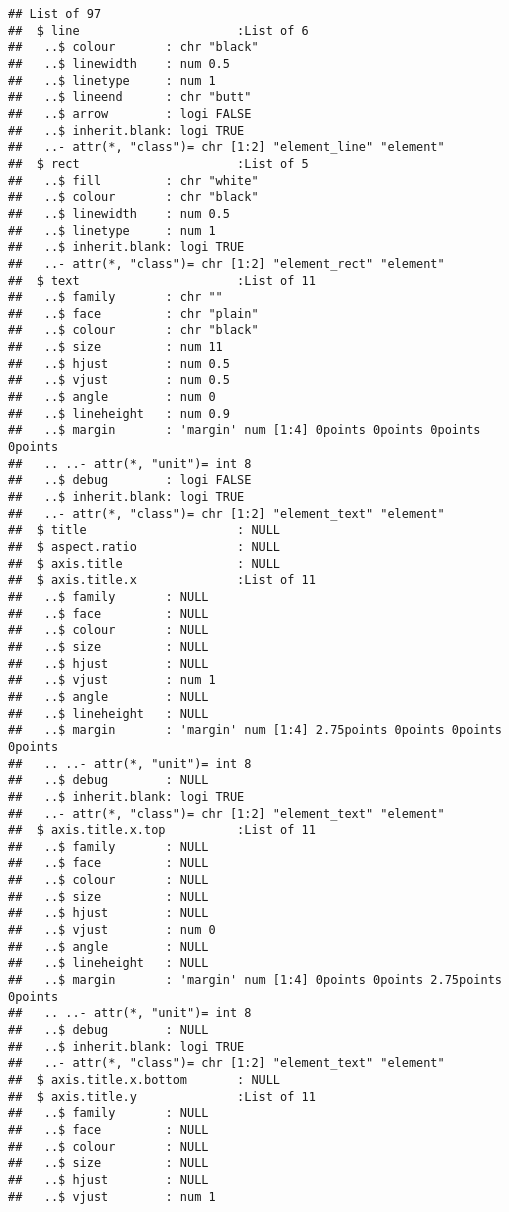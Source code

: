 \documentclass[
]{article}
\begin{document}
\begin{verbatim}
## List of 97
##  $ line                      :List of 6
##   ..$ colour       : chr "black"
##   ..$ linewidth    : num 0.5
##   ..$ linetype     : num 1
##   ..$ lineend      : chr "butt"
##   ..$ arrow        : logi FALSE
##   ..$ inherit.blank: logi TRUE
##   ..- attr(*, "class")= chr [1:2] "element_line" "element"
##  $ rect                      :List of 5
##   ..$ fill         : chr "white"
##   ..$ colour       : chr "black"
##   ..$ linewidth    : num 0.5
##   ..$ linetype     : num 1
##   ..$ inherit.blank: logi TRUE
##   ..- attr(*, "class")= chr [1:2] "element_rect" "element"
##  $ text                      :List of 11
##   ..$ family       : chr ""
##   ..$ face         : chr "plain"
##   ..$ colour       : chr "black"
##   ..$ size         : num 11
##   ..$ hjust        : num 0.5
##   ..$ vjust        : num 0.5
##   ..$ angle        : num 0
##   ..$ lineheight   : num 0.9
##   ..$ margin       : 'margin' num [1:4] 0points 0points 0points 0points
##   .. ..- attr(*, "unit")= int 8
##   ..$ debug        : logi FALSE
##   ..$ inherit.blank: logi TRUE
##   ..- attr(*, "class")= chr [1:2] "element_text" "element"
##  $ title                     : NULL
##  $ aspect.ratio              : NULL
##  $ axis.title                : NULL
##  $ axis.title.x              :List of 11
##   ..$ family       : NULL
##   ..$ face         : NULL
##   ..$ colour       : NULL
##   ..$ size         : NULL
##   ..$ hjust        : NULL
##   ..$ vjust        : num 1
##   ..$ angle        : NULL
##   ..$ lineheight   : NULL
##   ..$ margin       : 'margin' num [1:4] 2.75points 0points 0points 0points
##   .. ..- attr(*, "unit")= int 8
##   ..$ debug        : NULL
##   ..$ inherit.blank: logi TRUE
##   ..- attr(*, "class")= chr [1:2] "element_text" "element"
##  $ axis.title.x.top          :List of 11
##   ..$ family       : NULL
##   ..$ face         : NULL
##   ..$ colour       : NULL
##   ..$ size         : NULL
##   ..$ hjust        : NULL
##   ..$ vjust        : num 0
##   ..$ angle        : NULL
##   ..$ lineheight   : NULL
##   ..$ margin       : 'margin' num [1:4] 0points 0points 2.75points 0points
##   .. ..- attr(*, "unit")= int 8
##   ..$ debug        : NULL
##   ..$ inherit.blank: logi TRUE
##   ..- attr(*, "class")= chr [1:2] "element_text" "element"
##  $ axis.title.x.bottom       : NULL
##  $ axis.title.y              :List of 11
##   ..$ family       : NULL
##   ..$ face         : NULL
##   ..$ colour       : NULL
##   ..$ size         : NULL
##   ..$ hjust        : NULL
##   ..$ vjust        : num 1

\end{verbatim}
\end{document}
